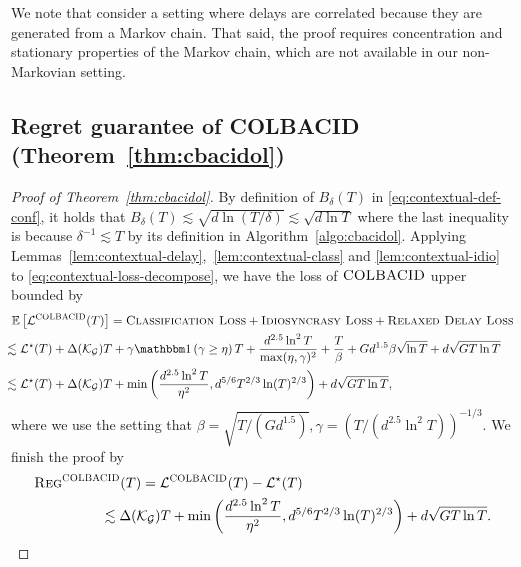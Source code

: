 We note that \cite{blanchet2023delay} consider a setting where delays are correlated because they are generated from a Markov chain. That said, the proof requires concentration and stationary properties of the Markov chain, which are not available in our non-Markovian setting.

\subsection{Regret guarantee of \textsc{COLBACID} (Theorem~\ref{thm:cbacidol})}\label{app:thm-cbacidol}
\begin{proof}[Proof of Theorem~\ref{thm:cbacidol}]
By definition of $B_{\delta}(T)$ in \eqref{eq:contextual-def-conf}, it holds that $B_{\delta}(T) \lesssim \sqrt{d\ln (T / \delta)} \lesssim \sqrt{d\ln T}$ where the last inequality is because $\delta^{-1} \lesssim T$ by its definition in Algorithm~\ref{algo:cbacidol}. Applying Lemmas~\ref{lem:contextual-delay},~\ref{lem:contextual-class} and \ref{lem:contextual-idio} to \eqref{eq:contextual-loss-decompose}, we have the loss of $\textsc{COLBACID}$ upper bounded by
\begin{align*}
\expect{\set{L}^{\conbacid}(T)} &= \textsc{Classification Loss} + \textsc{Idiosyncrasy Loss} + \textsc{Relaxed Delay Loss} \\
&\hspace{-1.2in}\lesssim \set{L}^\star(T) + \Delta(\set{K}_{\set{G}})T + \gamma\indic{\gamma \geq \eta}T + \frac{d^{2.5}\ln^{2} T}{\max(\eta,\gamma)^2}+\frac{T}{\beta} + Gd^{1.5}\beta\sqrt{\ln T} + d\sqrt{GT\ln T} \\
&\hspace{-1.2in}\lesssim \set{L}^\star(T)+ \Delta(\set{K}_{\set{G}})T+\min\left(\frac{d^{2.5}\ln^{2} T}{\eta^2}, d^{5/6}T^{2/3}\ln(T)^{2/3}\right)+ d\sqrt{GT\ln T},
\end{align*}
where we use the setting that $\beta = \sqrt{T / (Gd^{1.5})}, \gamma = (T / (d^{2.5}\ln^2 T))^{-1/3}.$ We finish the proof by
\begin{align*}
\textsc{Reg}^{\conbacid}(T) &= \set{L}^{\conbacid}(T) - \set{L}^\star(T) \\
&\hspace{-0.4in}\lesssim \Delta(\set{K}_{\set{G}})T+\min\left(\frac{d^{2.5}\ln^{2} T}{\eta^2}, d^{5/6}T^{2/3}\ln(T)^{2/3}\right)+ d\sqrt{GT\ln T}.
\end{align*}
\end{proof}

